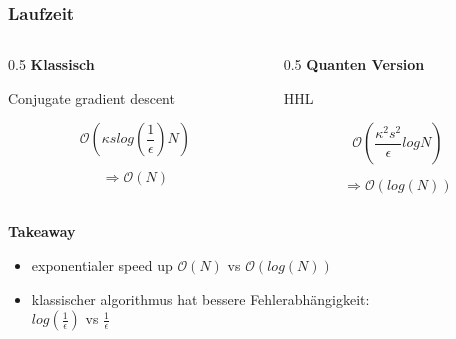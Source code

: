 \begin{frame}
    \frametitle{Laufzeit}
    \begin{columns}[c]
        \begin{column}{0.5\hsize}
            \textbf{Klassisch}

            \hfil

            Conjugate gradient descent 

            $$ \mathcal{O}(\kappa s log{\left(\frac 1 \epsilon\right)} N ) $$

            $$ \Rightarrow \mathcal{O} (N) $$

        \end{column}
        

        \begin{column}{0.5\hsize}
            \textbf{Quanten Version}

            \hfil

            HHL

            $$ \mathcal{O}(\frac{\kappa^2s^2}{\epsilon}logN) $$

            $$ \Rightarrow \mathcal{O} (log(N)) $$
        \end{column}

    \end{columns}
 
    \hfil

    \hfil

    \textbf{Takeaway}
    \begin{itemize}
        \item exponentialer speed up $\mathcal{O} (N)$ vs $\mathcal{O} (log(N))$
        \item klassischer algorithmus hat bessere Fehlerabhängigkeit: \\$log(\frac1{\epsilon})$ vs $\frac{1}{\epsilon}$
    \end{itemize}


\end{frame}



